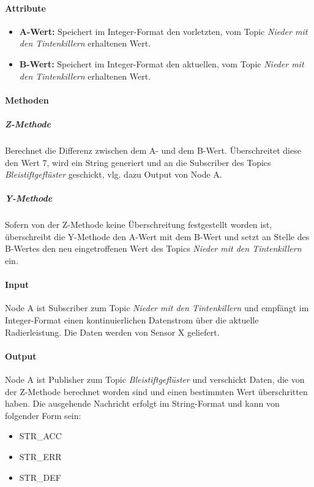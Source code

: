 \documentclass[a4paper, 12pt, titlepage]{scrartcl}
\begin{document}
				\paragraph{Attribute} %
				\begin{itemize}
					\item \textbf{A-Wert:} Speichert im Integer-Format den vorletzten, vom Topic \emph{Nieder mit den Tintenkillern} erhaltenen Wert.
					\item \textbf{B-Wert:} Speichert im Integer-Format den aktuellen, vom Topic \emph{Nieder mit den Tintenkillern} erhaltenen Wert.
				\end{itemize} 
				
				\paragraph{Methoden}
				
					\subparagraph{Z-Methode} Berechnet die Differenz zwischen dem A- und dem B-Wert. Überschreitet diese den Wert 7, wird ein String generiert und an die Subscriber des Topics \emph{Bleistiftgeflüster} geschickt, vlg. dazu Output von Node A.
					\subparagraph{Y-Methode} Sofern von der Z-Methode keine Überschreitung festgestellt worden ist, überschreibt die Y-Methode den A-Wert mit dem B-Wert und setzt an Stelle des B-Wertes den neu eingetroffenen Wert des Topics \emph{Nieder mit den Tintenkillern} ein. 
				
				\paragraph{Input} Node A ist Subscriber zum Topic \emph{Nieder mit den Tintenkillern} und empfängt im Integer-Format einen kontinuierlichen Datenstrom über die aktuelle Radierleistung. Die Daten werden von Sensor X geliefert. 
				
				\paragraph{Output} Node A ist Publisher zum Topic \emph{Bleistiftgeflüster} und verschickt Daten, die von der Z-Methode berechnet worden sind und einen bestimmten Wert überschritten haben. Die ausgehende Nachricht erfolgt im String-Format und kann von folgender Form sein:
				\begin{itemize}
					\item STR\_ACC
					\item STR\_ERR
					\item STR\_DEF
				\end{itemize}
				
\end{document}
